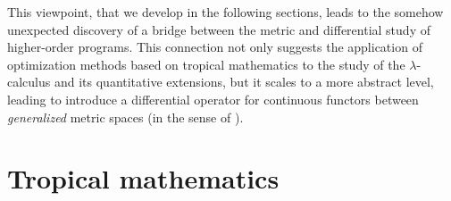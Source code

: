 This viewpoint, that we develop in the following sections, leads to the somehow unexpected discovery of a bridge between the metric and differential study of higher-order programs.
This connection not only suggests the application of optimization methods based on tropical mathematics to the study of the $\lambda$-calculus and its quantitative extensions, but it scales to a 
more abstract level, leading to introduce a 
differential operator for continuous functors between \emph{generalized} metric spaces (in the sense of \cite{Lawvere1973}). 

   
%
%
%
%
%
%
%
%
%



 
\section{Tropical mathematics%
}\label{sectionnew}

